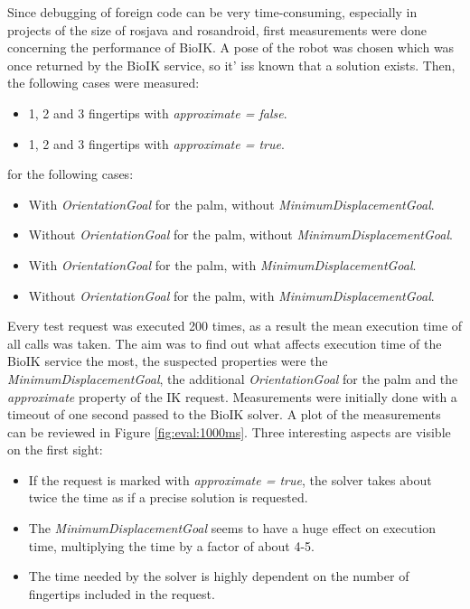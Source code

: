 Since debugging of foreign code can be very time-consuming, especially in projects of the size of rosjava and rosandroid, first measurements were done concerning the performance of BioIK. A pose of the robot was chosen which was once returned by the BioIK service, so it' iss known that a solution exists. Then, the following cases were measured:
\begin{itemize}
	\item 1, 2 and 3 fingertips with \textit{approximate = false}.
	\item 1, 2 and 3 fingertips with \textit{approximate = true}.
\end{itemize}

for the following cases:
\begin{itemize}
	\item With \textit{OrientationGoal} for the palm, without \textit{MinimumDisplacementGoal}.
	\item Without \textit{OrientationGoal} for the palm, without \textit{MinimumDisplacementGoal}.
	\item With \textit{OrientationGoal} for the palm, with \textit{MinimumDisplacementGoal}.
	\item Without \textit{OrientationGoal} for the palm, with \textit{MinimumDisplacementGoal}.
\end{itemize}

Every test request was executed 200 times, as a result the mean execution time of all calls was taken. The aim was to find out what affects execution time of the BioIK service the most, the suspected properties were the \textit{MinimumDisplacementGoal}, the additional \textit{OrientationGoal} for the palm and the \textit{approximate} property of the IK request. Measurements were initially done with a timeout of one second passed to the BioIK solver. A plot of the measurements can be reviewed in Figure \ref{fig:eval:1000ms}. Three interesting aspects are visible on the first sight:
\begin{itemize}
	\item If the request is marked with \textit{approximate = true}, the solver takes about twice the time as if a precise solution is requested.
	\item The \textit{MinimumDisplacementGoal} seems to have a huge effect on execution time, multiplying the time by a factor of about 4-5.
	\item The time needed by the solver is highly dependent on the number of fingertips included in the request. 
\end{itemize}


